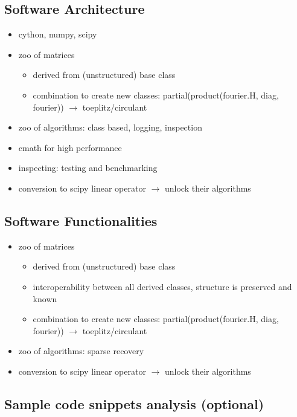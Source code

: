 

\subsection{Software Architecture}\label{architecture}


\begin{itemize}
\item cython, numpy, scipy
\item zoo of matrices
  \begin{itemize}
    \item derived from (unstructured) base class
    \item combination to create new classes: partial(product(fourier.H, diag, fourier)) $\rightarrow$ toeplitz/circulant
  \end{itemize}
\item zoo of algorithms: class based, logging, inspection
\item cmath for high performance
\item inspecting: testing and benchmarking
\item conversion to scipy linear operator $\rightarrow$ unlock their algorithms
\end{itemize}

\subsection{Software Functionalities}\label{features}

\begin{itemize}
  \item zoo of matrices
  \begin{itemize}
    \item derived from (unstructured) base class
    \item interoperability between all derived classes, structure is preserved and known
    \item combination to create new classes: partial(product(fourier.H, diag, fourier)) $\rightarrow$ toeplitz/circulant
  \end{itemize}
  \item zoo of algorithms: sparse recovery
  \item conversion to scipy linear operator $\rightarrow$ unlock their algorithms
\end{itemize}

\subsection{Sample code snippets analysis (optional)}\label{snippets}
